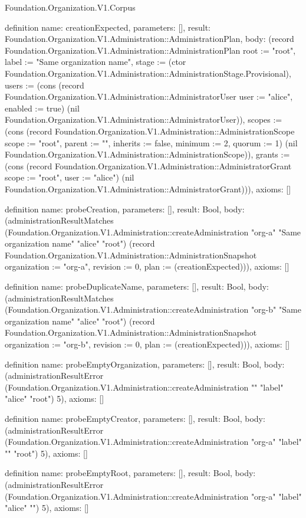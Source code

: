 \begin{lexlean}{Foundation.Organization.V1.Corpus}
\begin{semanticmodule}
definition{
  name: creationExpected,
  parameters: [],
  result: Foundation.Organization.V1.Administration::AdministrationPlan,
  body: (record Foundation.Organization.V1.Administration::AdministrationPlan {root := "root", label := "Same organization name", stage := (ctor Foundation.Organization.V1.Administration::AdministrationStage.Provisional), users := (cons (record Foundation.Organization.V1.Administration::AdministratorUser {user := "alice", enabled := true}) (nil Foundation.Organization.V1.Administration::AdministratorUser)), scopes := (cons (record Foundation.Organization.V1.Administration::AdministrationScope {scope := "root", parent := "", inherits := false, minimum := 2, quorum := 1}) (nil Foundation.Organization.V1.Administration::AdministrationScope)), grants := (cons (record Foundation.Organization.V1.Administration::AdministratorGrant {scope := "root", user := "alice"}) (nil Foundation.Organization.V1.Administration::AdministratorGrant))}),
  axioms: []
}

definition{
  name: probeCreation,
  parameters: [],
  result: Bool,
  body: (administrationResultMatches (Foundation.Organization.V1.Administration::createAdministration "org-a" "Same organization name" "alice" "root") (record Foundation.Organization.V1.Administration::AdministrationSnapshot {organization := "org-a", revision := 0, plan := (creationExpected)})),
  axioms: []
}

definition{
  name: probeDuplicateName,
  parameters: [],
  result: Bool,
  body: (administrationResultMatches (Foundation.Organization.V1.Administration::createAdministration "org-b" "Same organization name" "alice" "root") (record Foundation.Organization.V1.Administration::AdministrationSnapshot {organization := "org-b", revision := 0, plan := (creationExpected)})),
  axioms: []
}

definition{
  name: probeEmptyOrganization,
  parameters: [],
  result: Bool,
  body: (administrationResultError (Foundation.Organization.V1.Administration::createAdministration "" "label" "alice" "root") 5),
  axioms: []
}

definition{
  name: probeEmptyCreator,
  parameters: [],
  result: Bool,
  body: (administrationResultError (Foundation.Organization.V1.Administration::createAdministration "org-a" "label" "" "root") 5),
  axioms: []
}

definition{
  name: probeEmptyRoot,
  parameters: [],
  result: Bool,
  body: (administrationResultError (Foundation.Organization.V1.Administration::createAdministration "org-a" "label" "alice" "") 5),
  axioms: []
}


\end{semanticmodule}
\end{lexlean}
